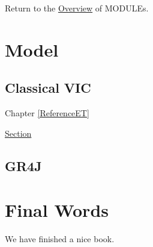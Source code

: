 \documentclass[
]{book}
\begin{document}
Return to the \protect\hyperlink{module}{Overview} of MODULEs.

\hypertarget{model}{%
\chapter{Model}\label{model}}

\hypertarget{classical-vic}{%
\section{Classical VIC}\label{classical-vic}}

Chapter \ref{ReferenceET}

\protect\hyperlink{ReferenceET}{Section}

\hypertarget{gr4j}{%
\section{GR4J}\label{gr4j}}

\hypertarget{final-words}{%
\chapter{Final Words}\label{final-words}}

We have finished a nice book.

  
\end{document}
